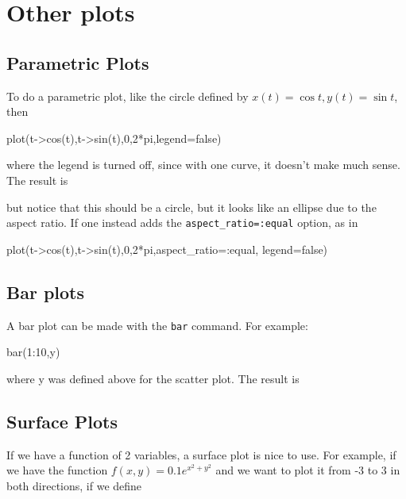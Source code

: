 \section{Other plots}

\subsection{Parametric Plots}

To do a parametric plot, like the circle defined by $x(t)=\cos t, y(t)=\sin t$, then

\begin{jlblock}[plots]
plot(t->cos(t),t->sin(t),0,2*pi,legend=false)
\end{jlblock}
%
where the legend is turned off, since with one curve, it doesn't make much sense. The result is
\begin{center}
\pgfplotsset{scale=0.7}
\end{center}


but notice that this should be a circle, but it looks like an ellipse
due to the aspect ratio. If one instead adds the
\verb!aspect_ratio=:equal! option, as in 
\begin{jlblock}[plots]
plot(t->cos(t),t->sin(t),0,2*pi,aspect_ratio=:equal, legend=false)
\end{jlblock}
\begin{center}
\pgfplotsset{scale=0.7}
\end{center}


\subsection{Bar plots}

A bar plot can be made with the \texttt{bar} command. For example:

\begin{jlblock}[plots]
bar(1:10,y)
\end{jlblock}
where y was defined above for the scatter plot.  The result is
%
\begin{center}
\pgfplotsset{scale=0.7}
\end{center}


\subsection{Surface Plots}

If we have a function of 2 variables, a surface plot is nice to use. For
example, if we have the function \(f(x,y)=0.1e^{x^2+y^2}\) and we want
to plot it from -3 to 3 in both directions, if we define

